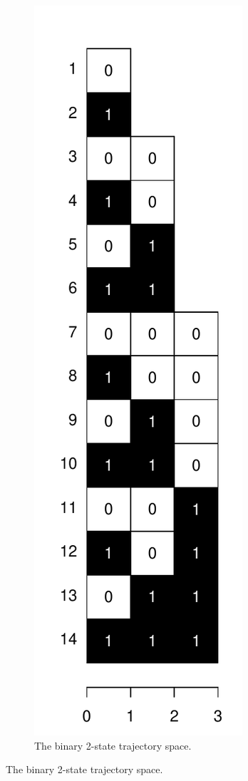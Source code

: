 \documentclass{bmcart}
\begin{document}
\begin{figure}
    \centering
    \begin{subfigure}[b]{0.4\textwidth}
        \includegraphics[scale=.5]{Figures/BernTraj.pdf}
        \caption{The binary 2-state trajectory space.}

\end{subfigure}
\end{figure}
\end{document}
